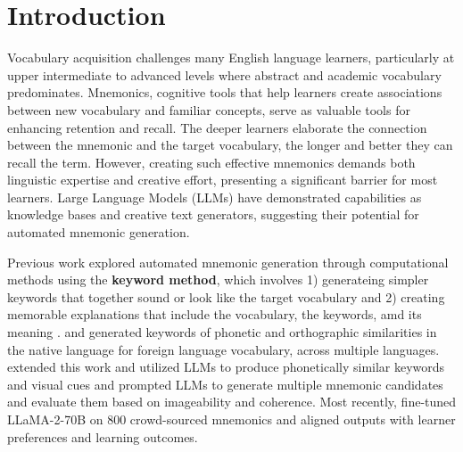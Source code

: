 \documentclass[11pt]{article}
\begin{document}
\section{Introduction}
Vocabulary acquisition challenges many English language learners, particularly at upper intermediate to advanced levels where abstract and academic vocabulary predominates. Mnemonics, cognitive tools that help learners create associations between new vocabulary and familiar concepts, serve as valuable tools for enhancing retention and recall. The deeper learners elaborate the connection between the mnemonic and the target vocabulary, the longer and better they can recall the term. However, creating such effective mnemonics demands both linguistic expertise and creative effort, presenting a significant barrier for most learners. Large Language Models (LLMs) have demonstrated capabilities as knowledge bases and creative text generators, suggesting their potential for automated mnemonic generation.

Previous work explored automated mnemonic generation through computational methods using the \textbf{keyword method}, which involves 1) generateing simpler keywords that together sound or look like the target vocabulary and 2) creating memorable explanations that include the vocabulary, the keywords, amd its meaning \citep{atkinsonApplicationMnemonicKeyword1975}. \citet{savvaTransPhonerAutomatedMnemonic2014} and \citet{OzbalAUTOMATION2014} generated keywords of phonetic and orthographic similarities in the native language for foreign language vocabulary, across multiple languages. \citet{LeeSMARTPHONE2023} extended this work and utilized LLMs to produce phonetically similar keywords and visual cues and \citet{LeeEXPLORING2024} prompted LLMs to generate multiple mnemonic candidates and evaluate them based on imageability and coherence. Most recently, \citet{balepurSMART2024} fine-tuned LLaMA-2-70B on 800 crowd-sourced mnemonics and aligned outputs with learner preferences and learning outcomes.

\end{document}
